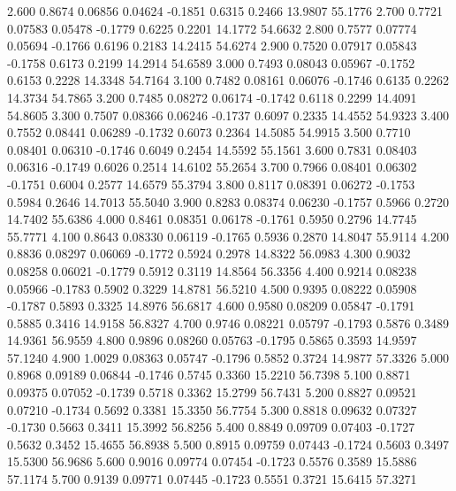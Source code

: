    2.600   0.8674   0.06856   0.04624  -0.1851   0.6315   0.2466  13.9807  55.1776
   2.700   0.7721   0.07583   0.05478  -0.1779   0.6225   0.2201  14.1772  54.6632
   2.800   0.7577   0.07774   0.05694  -0.1766   0.6196   0.2183  14.2415  54.6274
   2.900   0.7520   0.07917   0.05843  -0.1758   0.6173   0.2199  14.2914  54.6589
   3.000   0.7493   0.08043   0.05967  -0.1752   0.6153   0.2228  14.3348  54.7164
   3.100   0.7482   0.08161   0.06076  -0.1746   0.6135   0.2262  14.3734  54.7865
   3.200   0.7485   0.08272   0.06174  -0.1742   0.6118   0.2299  14.4091  54.8605
   3.300   0.7507   0.08366   0.06246  -0.1737   0.6097   0.2335  14.4552  54.9323
   3.400   0.7552   0.08441   0.06289  -0.1732   0.6073   0.2364  14.5085  54.9915
   3.500   0.7710   0.08401   0.06310  -0.1746   0.6049   0.2454  14.5592  55.1561
   3.600   0.7831   0.08403   0.06316  -0.1749   0.6026   0.2514  14.6102  55.2654
   3.700   0.7966   0.08401   0.06302  -0.1751   0.6004   0.2577  14.6579  55.3794
   3.800   0.8117   0.08391   0.06272  -0.1753   0.5984   0.2646  14.7013  55.5040
   3.900   0.8283   0.08374   0.06230  -0.1757   0.5966   0.2720  14.7402  55.6386
   4.000   0.8461   0.08351   0.06178  -0.1761   0.5950   0.2796  14.7745  55.7771
   4.100   0.8643   0.08330   0.06119  -0.1765   0.5936   0.2870  14.8047  55.9114
   4.200   0.8836   0.08297   0.06069  -0.1772   0.5924   0.2978  14.8322  56.0983
   4.300   0.9032   0.08258   0.06021  -0.1779   0.5912   0.3119  14.8564  56.3356
   4.400   0.9214   0.08238   0.05966  -0.1783   0.5902   0.3229  14.8781  56.5210
   4.500   0.9395   0.08222   0.05908  -0.1787   0.5893   0.3325  14.8976  56.6817
   4.600   0.9580   0.08209   0.05847  -0.1791   0.5885   0.3416  14.9158  56.8327
   4.700   0.9746   0.08221   0.05797  -0.1793   0.5876   0.3489  14.9361  56.9559
   4.800   0.9896   0.08260   0.05763  -0.1795   0.5865   0.3593  14.9597  57.1240
   4.900   1.0029   0.08363   0.05747  -0.1796   0.5852   0.3724  14.9877  57.3326
   5.000   0.8968   0.09189   0.06844  -0.1746   0.5745   0.3360  15.2210  56.7398
   5.100   0.8871   0.09375   0.07052  -0.1739   0.5718   0.3362  15.2799  56.7431
   5.200   0.8827   0.09521   0.07210  -0.1734   0.5692   0.3381  15.3350  56.7754
   5.300   0.8818   0.09632   0.07327  -0.1730   0.5663   0.3411  15.3992  56.8256
   5.400   0.8849   0.09709   0.07403  -0.1727   0.5632   0.3452  15.4655  56.8938
   5.500   0.8915   0.09759   0.07443  -0.1724   0.5603   0.3497  15.5300  56.9686
   5.600   0.9016   0.09774   0.07454  -0.1723   0.5576   0.3589  15.5886  57.1174
   5.700   0.9139   0.09771   0.07445  -0.1723   0.5551   0.3721  15.6415  57.3271
